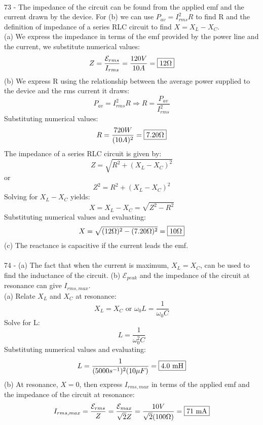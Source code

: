 \documentclass{report}
\begin{document}
\paragraph{}
73 - The impedance of the circuit can be found from the applied emf and the current drawn by the device. For (b) we can use $P_{av} = I_{rms}^2R$ to find R and the definition of impedance of a series RLC circuit to find $X = X_L - X_C$.\\
(a) We express the impedance in terms of the emf provided by the power line and the current, we substitute numerical values:
$$Z = \frac{\mathcal{E}_{rms}}{I_{rms}} = \frac{120 V}{10 A} = \fbox{$12 \Omega$}$$
(b) We express R using the relationship between the average power supplied to the device and the rms current it draws:
$$P_{av} = I_{rms}^2R \Rightarrow R = \frac{P_{av}}{I_{rms}^2}$$
Substituting numerical values:
$$R = \frac{720 W}{(10 A)^2} = \fbox{$7.20 \Omega$}$$
The impedance of a series RLC circuit is given by:
$$Z = \sqrt{R^2 + (X_L - X_C)^2}$$
or
$$Z^2 = R^2 + (X_L - X_C)^2$$
Solving for $X_L - X_C$ yields:
$$X = X_L - X_C = \sqrt{Z^2 - R^2}$$
Substituting numerical values and evaluating:
$$X = \sqrt{(12 \Omega)^2 - (7.20 \Omega)^2} = \fbox{$10 \Omega$}$$
(c) The reactance is capacitive if the current leads the emf.

\paragraph{}
74 - (a) The fact that when the current is maximum, $X_L = X_C$, can be used to find the inductance of the circuit. (b) $\mathcal{E}_{peak}$ and the impedance of the circuit at resonance can give $I_{rms, max}$.\\
(a) Relate $X_L$ and $X_C$ at resonance:
$$X_L = X_C \text{ or } \omega_0 L = \frac{1}{\omega_0 C}$$
Solve for L:
$$L = \frac{1}{\omega_0^2C}$$
Substituting numerical values and evaluating:
$$L = \frac{1}{(5000s^{-1})^2(10 \mu F)} = \fbox{4.0 mH}$$
(b) At resonance, $X = 0$, then express $I_{rms, max}$ in terms of the applied emf and the impedance of the circuit at resonance:
$$I_{rms, max} = \frac{\mathcal{E}_{rms}}{Z} = \frac{\mathcal{E}_{max}}{\sqrt{2}Z} = \frac{10 V}{\sqrt{2}(100 \Omega)} = \fbox{71 mA}$$
\end{document}
